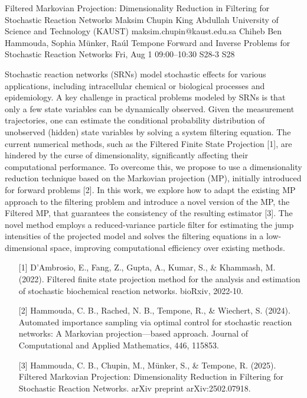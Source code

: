 \begin{talk}
  {Filtered Markovian Projection: Dimensionality Reduction in Filtering for Stochastic Reaction Networks}%
  {Maksim Chupin}%
  {King Abdullah University of Science and Technology (KAUST)}%
  {maksim.chupin@kaust.edu.sa}%
  {Chiheb Ben Hammouda, Sophia M\"{u}nker, Ra\'{u}l Tempone}%
  {Forward and Inverse Problems for Stochastic Reaction Networks}%
  {Fri, Aug 1 09:00–10:30}%
  {S28-3}%
  {S28}%
				
			
Stochastic reaction networks (SRNs) model stochastic effects for various applications, including intracellular chemical or biological processes and epidemiology. A key challenge in practical problems modeled by SRNs is that only a few state variables can be dynamically observed. Given the measurement trajectories, one can estimate the conditional probability distribution of unobserved (hidden) state variables by solving a system filtering equation. The current numerical methods, such as the Filtered Finite State Projection [1], are hindered by the curse of dimensionality, significantly affecting their computational performance. To overcome this, we propose to use a dimensionality reduction technique based on the Markovian projection (MP), initially introduced for forward problems [2]. In this work, we explore how to adapt the existing MP approach to the filtering problem and introduce a novel version of the MP, the Filtered MP, that guarantees the consistency of the resulting estimator [3]. The novel method employs a reduced-variance particle filter for estimating the jump intensities of the projected model and solves the filtering equations in a low-dimensional space, improving computational efficiency over existing methods.





\medskip

\begin{enumerate}
	\item[{[1]}] D’Ambrosio, E., Fang, Z., Gupta, A., Kumar, S., \& Khammash, M. (2022). Filtered finite state projection method for the analysis and estimation of stochastic biochemical reaction networks. bioRxiv, 2022-10.
	\item[{[2]}] Hammouda, C. B., Rached, N. B., Tempone, R., \& Wiechert, S. (2024). Automated importance sampling via optimal control for stochastic reaction networks: A Markovian projection---based approach. Journal of Computational and Applied Mathematics, 446, 115853.
    \item [{[3]}] Hammouda, C. B., Chupin, M., Münker, S., \& Tempone, R. (2025). Filtered Markovian Projection: Dimensionality Reduction in Filtering for Stochastic Reaction Networks. arXiv preprint arXiv:2502.07918.
\end{enumerate}


\end{talk}

